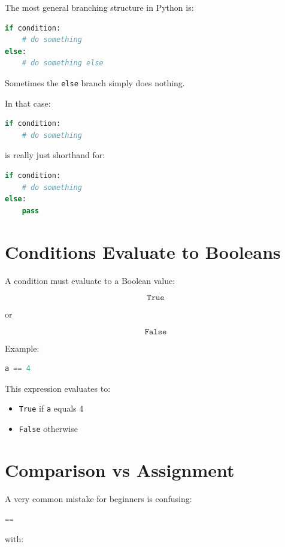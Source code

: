 \documentclass[11pt]{article}
\begin{document}
The most general branching structure in Python is:

\begin{lstlisting}[language=Python]
if condition:
    # do something
else:
    # do something else
\end{lstlisting}

Sometimes the \texttt{else} branch simply does nothing.

In that case:

\begin{lstlisting}[language=Python]
if condition:
    # do something
\end{lstlisting}

is really just shorthand for:

\begin{lstlisting}[language=Python]
if condition:
    # do something
else:
    pass
\end{lstlisting}

\section{Conditions Evaluate to Booleans}

A condition must evaluate to a Boolean value:

\[
\texttt{True}
\]

or

\[
\texttt{False}
\]

Example:

\begin{lstlisting}[language=Python]
a == 4
\end{lstlisting}

This expression evaluates to:

\begin{itemize}
    \item \texttt{True} if \texttt{a} equals 4
    \item \texttt{False} otherwise
\end{itemize}

\section{Comparison vs Assignment}

A very common mistake for beginners is confusing:

\begin{lstlisting}[language=Python]
==
\end{lstlisting}

with:
\end{document}
